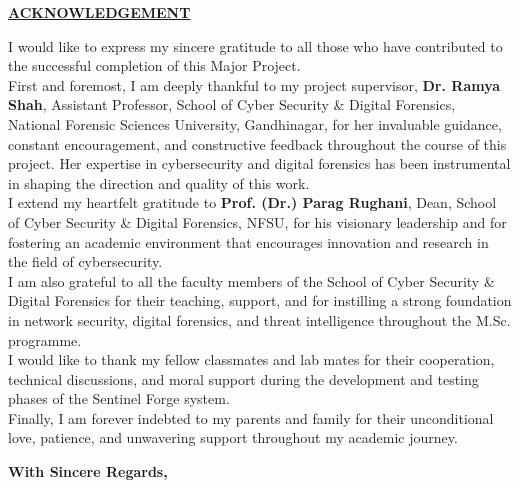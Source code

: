 {\centering
	\par
	\large \textbf{\underline{ACKNOWLEDGEMENT}} \par
}\vspace{0.7cm}

\noindent I would like to express my sincere gratitude to all those who have contributed to the successful completion of this Major Project.\\

\noindent First and foremost, I am deeply thankful to my project supervisor, \textbf{Dr. Ramya Shah}, Assistant Professor, School of Cyber Security \& Digital Forensics, National Forensic Sciences University, Gandhinagar, for her invaluable guidance, constant encouragement, and constructive feedback throughout the course of this project. Her expertise in cybersecurity and digital forensics has been instrumental in shaping the direction and quality of this work.\\

\noindent I extend my heartfelt gratitude to \textbf{Prof. (Dr.) Parag Rughani}, Dean, School of Cyber Security \& Digital Forensics, NFSU, for his visionary leadership and for fostering an academic environment that encourages innovation and research in the field of cybersecurity.\\

\noindent I am also grateful to all the faculty members of the School of Cyber Security \& Digital Forensics for their teaching, support, and for instilling a strong foundation in network security, digital forensics, and threat intelligence throughout the M.Sc. programme.\\

\noindent I would like to thank my fellow classmates and lab mates for their cooperation, technical discussions, and moral support during the development and testing phases of the Sentinel Forge system.\\

\noindent Finally, I am forever indebted to my parents and family for their unconditional love, patience, and unwavering support throughout my academic journey.\\

\vspace{1cm}
\begin{flushright}
	\textbf{With Sincere Regards,}\\
	\textbf{\StudentName}\\
	\textbf{\ProgramName}
\end{flushright}